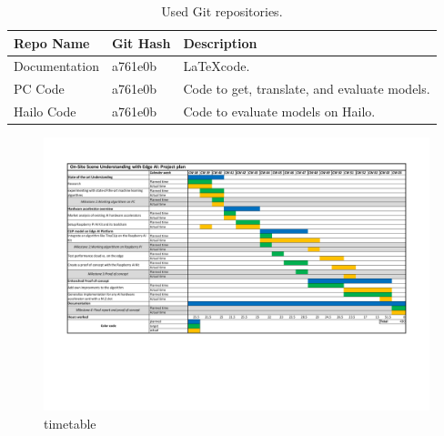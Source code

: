 \begin{table}[h!]
    \centering
    \begin{tabularx}{\textwidth}{|l|l|X|}
        \hline
        \textbf{Repo Name} & \textbf{Git Hash} & \textbf{Description}   \\ \hline
        Documentation & a761e0b & \LaTeX code. \\ \hline
        PC Code & a761e0b & Code to get, translate, and evaluate models. \\ \hline
        Hailo Code & a761e0b & Code to evaluate models on Hailo. \\ \hline
    \end{tabularx}
    \caption{Used Git repositories.}
    \label{tab:git}
\end{table}

\begin{figure}
    \centering
    \includegraphics[angle = 90,height = \textheight]{Images/appendix/timetable_Lukas_cut.pdf}
    \caption{timetable}
\end{figure}